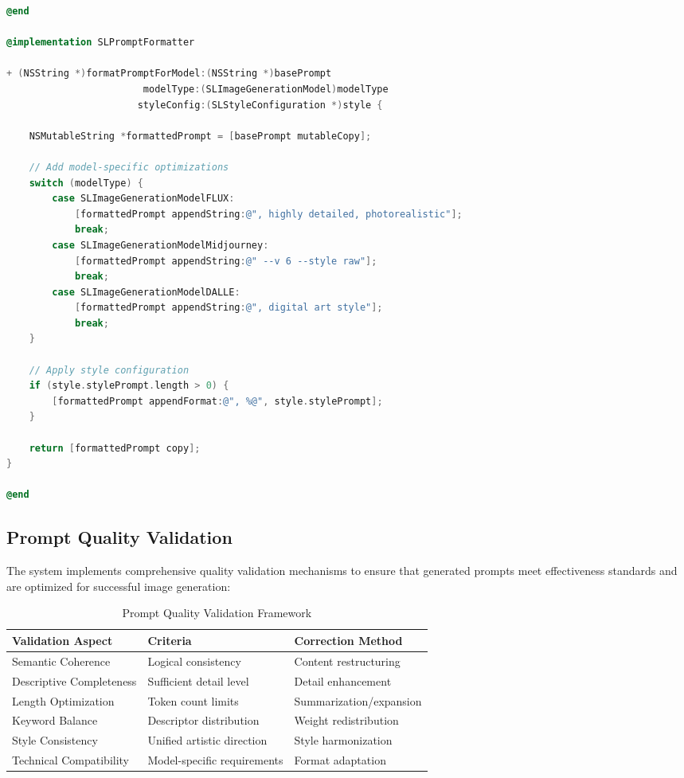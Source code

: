 \begin{lstlisting}[language=C,basicstyle=\footnotesize\ttfamily,frame=single,breaklines=true,columns=flexible,caption={Simple Caching Implementation},label={lst:simple_caching}]
@end

@implementation SLPromptFormatter

+ (NSString *)formatPromptForModel:(NSString *)basePrompt 
                        modelType:(SLImageGenerationModel)modelType
                       styleConfig:(SLStyleConfiguration *)style {
    
    NSMutableString *formattedPrompt = [basePrompt mutableCopy];
    
    // Add model-specific optimizations
    switch (modelType) {
        case SLImageGenerationModelFLUX:
            [formattedPrompt appendString:@", highly detailed, photorealistic"];
            break;
        case SLImageGenerationModelMidjourney:
            [formattedPrompt appendString:@" --v 6 --style raw"];
            break;
        case SLImageGenerationModelDALLE:
            [formattedPrompt appendString:@", digital art style"];
            break;
    }
    
    // Apply style configuration
    if (style.stylePrompt.length > 0) {
        [formattedPrompt appendFormat:@", %@", style.stylePrompt];
    }
    
    return [formattedPrompt copy];
}

@end
\end{lstlisting}

\subsection{Prompt Quality Validation}

The system implements comprehensive quality validation mechanisms to ensure that generated prompts meet effectiveness standards and are optimized for successful image generation:

\begin{table}[H]
\centering
\caption{Prompt Quality Validation Framework}
\label{tab:prompt_validation}
{\begin{tabular}{lll}
\toprule
\textbf{Validation Aspect} & \textbf{Criteria} & \textbf{Correction Method} \\
\midrule
Semantic Coherence & Logical consistency & Content restructuring \\
Descriptive Completeness & Sufficient detail level & Detail enhancement \\
Length Optimization & Token count limits & Summarization/expansion \\
Keyword Balance & Descriptor distribution & Weight redistribution \\
Style Consistency & Unified artistic direction & Style harmonization \\
Technical Compatibility & Model-specific requirements & Format adaptation \\
\bottomrule
\end{tabular}}
\end{table}

